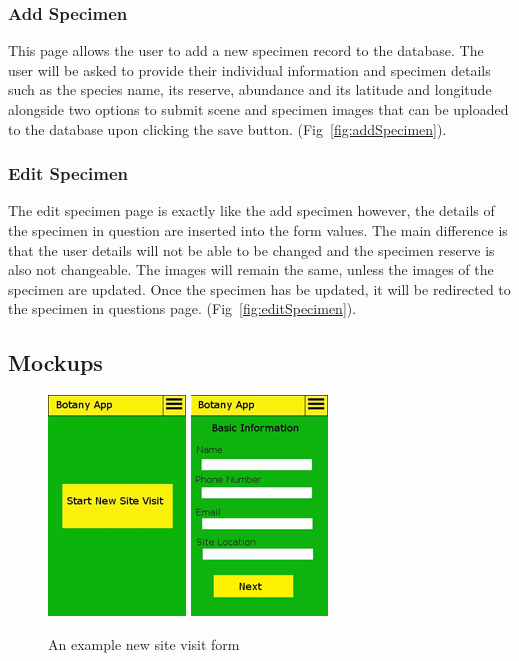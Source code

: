  \subsubsection{ Add Specimen}
     This page allows the user to add a new specimen record to the database. The user will be asked to provide their individual information and specimen details such as the species name, its reserve, abundance and its latitude and longitude alongside two options to submit scene and specimen images that can be uploaded to the database upon clicking the save button.  (Fig~\ref{fig:addSpecimen}).

 \subsubsection{Edit Specimen}
        The edit specimen page is exactly like the add specimen however, the details of the specimen in question are inserted into the form values. The main difference is that the user details will not be able to be changed and the specimen reserve is also not changeable. The images will remain the same, unless the images of the specimen are updated. Once the specimen has be updated, it will be redirected to the specimen in questions page.  (Fig~\ref{fig:editSpecimen}).

    \subsection{Mockups}

        \begin{figure}
            \centering
            \includegraphics[scale=1]{uiDesign/botanyAppNewSiteVisit1.png}
            \includegraphics[scale=1]{uiDesign/botanyAppNewSiteVisit2.png}
            \caption{An example new site visit form}
            \label{fig:newSiteVisit}
        \end{figure}

